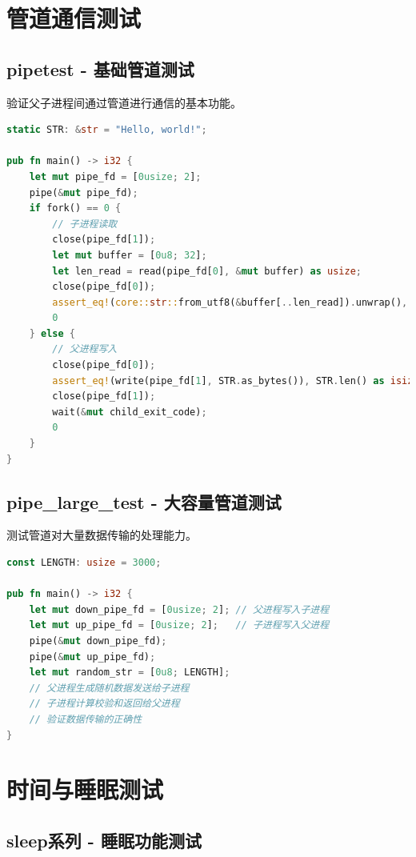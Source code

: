 \section{管道通信测试}

\subsection{pipetest - 基础管道测试}

验证父子进程间通过管道进行通信的基本功能。

\begin{lstlisting}[language=Rust]
static STR: &str = "Hello, world!";

pub fn main() -> i32 {
    let mut pipe_fd = [0usize; 2];
    pipe(&mut pipe_fd);
    if fork() == 0 {
        // 子进程读取
        close(pipe_fd[1]);
        let mut buffer = [0u8; 32];
        let len_read = read(pipe_fd[0], &mut buffer) as usize;
        close(pipe_fd[0]);
        assert_eq!(core::str::from_utf8(&buffer[..len_read]).unwrap(), STR);
        0
    } else {
        // 父进程写入
        close(pipe_fd[0]);
        assert_eq!(write(pipe_fd[1], STR.as_bytes()), STR.len() as isize);
        close(pipe_fd[1]);
        wait(&mut child_exit_code);
        0
    }
}
\end{lstlisting}

\subsection{pipe\_large\_test - 大容量管道测试}

测试管道对大量数据传输的处理能力。

\begin{lstlisting}[language=Rust]
const LENGTH: usize = 3000;

pub fn main() -> i32 {
    let mut down_pipe_fd = [0usize; 2]; // 父进程写入子进程
    let mut up_pipe_fd = [0usize; 2];   // 子进程写入父进程
    pipe(&mut down_pipe_fd);
    pipe(&mut up_pipe_fd);
    let mut random_str = [0u8; LENGTH];
    // 父进程生成随机数据发送给子进程
    // 子进程计算校验和返回给父进程
    // 验证数据传输的正确性
}
\end{lstlisting}

\section{时间与睡眠测试}

\subsection{sleep系列 - 睡眠功能测试}

